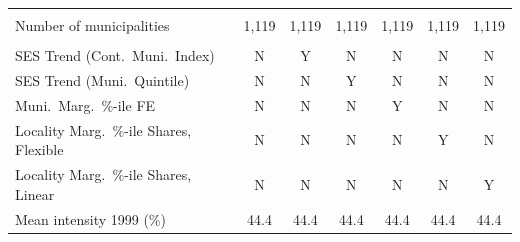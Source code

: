 \begin{tabular}{lcccccc}
  & & & & & & \\ 
Number of municipalities &        1,119 &        1,119 &        1,119 &        1,119 &        1,119 &        1,119 \\ 
  & & & & & & \\ 
SES Trend (Cont.\ Muni.\ Index) & N & Y & N & N & N & N \\ 
SES Trend (Muni.\ Quintile) & N & N & Y & N & N & N \\ 
Muni.\ Marg.\ \%-ile FE & N & N & N & Y & N & N \\ 
Locality Marg.\ \%-ile Shares, Flexible & N & N & N & N & Y & N \\ 
Locality Marg.\ \%-ile Shares, Linear & N & N & N & N & N & Y \\ 
Mean intensity 1999 (\%) &   44.4 &   44.4 &   44.4 &   44.4 &   44.4 &   44.4 \\ 
\bottomrule
\end{tabular}